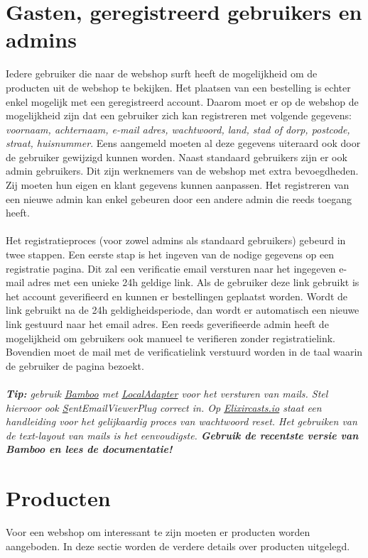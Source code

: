 \documentclass{article}
\begin{document}
\section{Gasten, geregistreerd gebruikers en admins}
Iedere gebruiker die naar de webshop surft heeft de mogelijkheid om de producten uit de webshop te bekijken. Het plaatsen van een bestelling is echter enkel mogelijk met een geregistreerd account. Daarom moet er op de webshop de mogelijkheid zijn dat een gebruiker zich kan registreren met volgende gegevens: \textit{voornaam, achternaam, e-mail adres, wachtwoord, land, stad of dorp, postcode, straat, huisnummer}. Eens aangemeld moeten al deze gegevens uiteraard ook door de gebruiker gewijzigd kunnen worden. Naast standaard gebruikers zijn er ook admin gebruikers. Dit zijn werknemers van de webshop met extra bevoegdheden. Zij moeten hun eigen en klant gegevens kunnen aanpassen. Het registreren van een nieuwe admin kan enkel gebeuren door een andere admin die reeds toegang heeft. 
\\ 
\\
Het registratieproces (voor zowel admins als standaard gebruikers) gebeurd in twee stappen. Een eerste stap is het ingeven van de nodige gegevens op een registratie pagina. Dit zal een verificatie email versturen naar het ingegeven e-mail adres met een unieke 24h geldige link. Als de gebruiker deze link gebruikt is het account geverifieerd en kunnen er bestellingen geplaatst worden. Wordt de link gebruikt na de 24h geldigheidsperiode, dan wordt er automatisch een nieuwe link gestuurd naar het email adres. Een reeds geverifieerde admin heeft de mogelijkheid om gebruikers ook manueel te verifieren zonder registratielink. Bovendien moet de mail met de verificatielink verstuurd worden in de taal waarin de gebruiker de pagina bezoekt. 
\\
\\
\textit{\textbf{Tip:} gebruik \href{https://hexdocs.pm/bamboo/1.1.0/readme.html}{Bamboo}  met \href{https://hexdocs.pm/bamboo/Bamboo.LocalAdapter.html}{LocalAdapter} voor het versturen van mails. Stel hiervoor ook \href{https://hexdocs.pm/bamboo/Bamboo.SentEmailViewerPlug.html}SentEmailViewerPlug correct in. Op \href{https://elixircasts.io/password-reset}{Elixircasts.io} staat een handleiding voor het gelijkaardig proces van wachtwoord reset. Het gebruiken van de text-layout van mails is het eenvoudigste. \textbf{Gebruik de recentste versie van Bamboo en lees de documentatie!}}

\section{Producten}
Voor een webshop om interessant te zijn moeten er producten worden aangeboden. In deze sectie worden de verdere details over producten uitgelegd.
\end{document}
